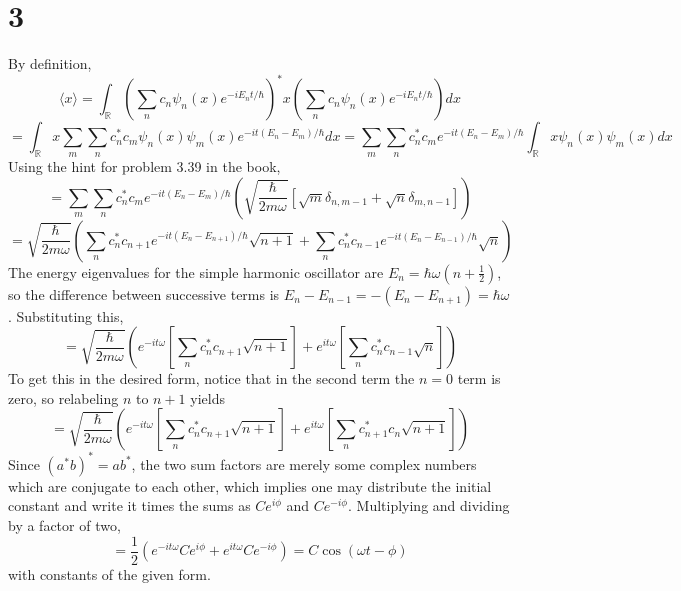 \documentclass{article}
\begin{document}
\section*{3}
By definition,
\[\langle x \rangle=\int_{\mathbb{R}}\left( \sum_{n}c_{n}\psi_{n}(x)e^{-iE_{n} t/\hbar} \right)^{*}x
  \left( \sum_{n}c_{n}\psi_{n}(x)e^{-iE_{n} t/\hbar} \right)dx\]
\[
  =\int_{\mathbb{R}}x\sum_{m}\sum_{n}c_{n}^{*}c_{m}\psi_{n}(x)\psi_{m}(x)e^{-it(E_{n}-E_{m})/\hbar}dx
  =\sum_{m}\sum_{n}c_{n}^{*}c_{m}e^{-it(E_{n}-E_{m})/\hbar}\int_{\mathbb{R}}x\psi_{n}(x)\psi_{m}(x)dx
\]
Using the hint for problem 3.39 in the book,
\[
  =\sum_{m}\sum_{n}c_{n}^{*}c_{m}e^{-it(E_n-E_{m})/\hbar}\left( \sqrt{\frac{\hbar}{2m\omega}}
    \left[  \sqrt{m}\delta_{n,m-1}+\sqrt{n}\delta_{m,n-1} \right] \right)
\]
\[
  =\sqrt{\frac{\hbar}{2m\omega}}\left(  \sum_{n}c_{n}^{*}c_{n+1}e^{-it(E_{n}-E_{n+1})/\hbar}\sqrt{n+1}
    +\sum_{n}c_{n}^{*}c_{n-1}e^{-it(E_{n}-E_{n-1})/\hbar}\sqrt{n}\right)
\]
The energy eigenvalues for the simple harmonic oscillator are $E_{n}=\hbar\omega(n+\frac{1}{2})$, so the difference between successive
terms is $E_{n}-E_{n-1}=-(E_{n}-E_{n+1})=\hbar\omega$. Substituting this,
\[
  =\sqrt{\frac{\hbar}{2m\omega}}\left( e^{-it\omega}\left[  \sum_{n}c_{n}^{*}c_{n+1}\sqrt{n+1} \right]
  +e^{it\omega}\left[ \sum_{n}c_{n}^{*}c_{n-1} \sqrt{n}\right]\right)
\]
To get this in the desired form, notice that in the second term the $n=0$ term is zero, so relabeling $n$ to $n+1$ yields
\[
  =\sqrt{\frac{\hbar}{2m\omega}}\left( e^{-it\omega}\left[  \sum_{n}c_{n}^{*}c_{n+1}\sqrt{n+1} \right]
  +e^{it\omega}\left[ \sum_{n}c_{n+1}^{*}c_{n} \sqrt{n+1}\right]\right)
\]
Since $(a^{*}b)^{*}=ab^{*}$, the two sum factors are merely some complex numbers which are conjugate to each other, which
implies one may distribute the initial constant and write it times the sums as $Ce^{i\phi}$ and $Ce^{-i\phi}$. Multiplying and dividing by a factor of two,
\[
  =\frac{1}{2}\left( e^{-it\omega}Ce^{i\phi}+e^{it\omega}Ce^{-i\phi}\right)
  =C\cos(\omega t-\phi)
\]
with constants of the given form.
\end{document}
